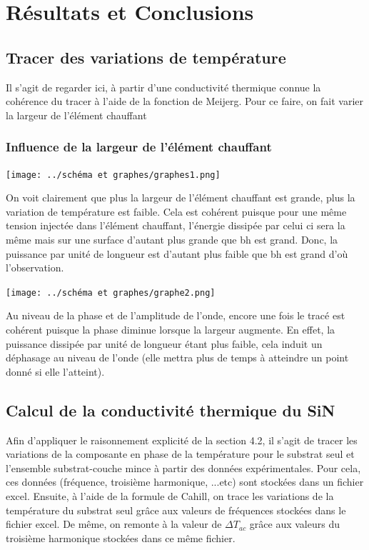 \documentclass[10pt,a4paper]{report}
\begin{document}
\section{Résultats et Conclusions}
\subsection{Tracer des variations de température}
Il s'agit de regarder ici, à partir d'une conductivité thermique connue la cohérence du tracer à l'aide de la fonction de Meijerg.
Pour ce faire, on fait varier  la largeur de l'élément chauffant
\subsubsection{Influence de la largeur de l'élément chauffant}
\begin{center}
\texttt{[image: ../schéma et graphes/graphes1.png]} 
\end{center}
On voit clairement que plus la largeur de l'élément chauffant est grande, plus la variation de température est faible. Cela est cohérent puisque pour une même tension injectée dans l'élément chauffant, l'énergie dissipée par celui ci sera la même mais sur une surface d'autant plus grande que bh est grand. Donc, la puissance par unité de longueur est d'autant plus faible que bh est grand d'où l'observation.
\begin{center}
\texttt{[image: ../schéma et graphes/graphe2.png]}
\end{center}
Au niveau de la phase et de l'amplitude de l'onde, encore une fois le tracé est cohérent puisque la phase diminue lorsque la largeur augmente. En effet, la puissance dissipée par unité de longueur étant plus faible, cela induit un déphasage au niveau de l'onde (elle mettra plus de temps à atteindre un point donné si elle l'atteint).
\subsection{Calcul de la conductivité thermique du SiN}
Afin d'appliquer le raisonnement explicité de la section 4.2, il s'agit de tracer les variations de la composante en phase de la température pour le substrat seul et l'ensemble substrat-couche mince à partir des données expérimentales. Pour cela, ces données (fréquence, troisième harmonique, ...etc) sont stockées dans un fichier excel. 
\newline
Ensuite, à l'aide de la formule de Cahill, on trace les variations de la température du substrat seul grâce aux valeurs de fréquences stockées dans le fichier excel. De même, on remonte à la valeur de $\Delta T_{ac}$ grâce aux valeurs du troisième harmonique stockées dans ce même fichier.
\end{document}
